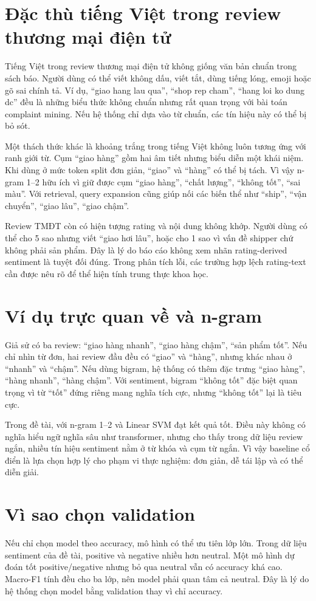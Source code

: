 \section{Đặc thù tiếng Việt trong review thương mại điện tử}
Tiếng Việt trong review thương mại điện tử không giống văn bản chuẩn trong sách báo. Người dùng có thể viết không dấu, viết tắt, dùng tiếng lóng, emoji hoặc gõ sai chính tả. Ví dụ, “giao hang lau qua”, “shop rep cham”, “hang loi ko dung dc” đều là những biểu thức không chuẩn nhưng rất quan trọng với bài toán complaint mining. Nếu hệ thống chỉ dựa vào từ chuẩn, các tín hiệu này có thể bị bỏ sót.

Một thách thức khác là khoảng trắng trong tiếng Việt không luôn tương ứng với ranh giới từ. Cụm “giao hàng” gồm hai âm tiết nhưng biểu diễn một khái niệm. Khi dùng \TFIDF{} ở mức token split đơn giản, “giao” và “hàng” có thể bị tách. Vì vậy n-gram 1--2 hữu ích vì giữ được cụm “giao hàng”, “chất lượng”, “không tốt”, “sai màu”. Với retrieval, query expansion cũng giúp nối các biến thể như “ship”, “vận chuyển”, “giao lâu”, “giao chậm”.

Review TMĐT còn có hiện tượng rating và nội dung không khớp. Người dùng có thể cho 5 sao nhưng viết “giao hơi lâu”, hoặc cho 1 sao vì vấn đề shipper chứ không phải sản phẩm. Đây là lý do báo cáo không xem nhãn rating-derived sentiment là tuyệt đối đúng. Trong phân tích lỗi, các trường hợp lệch rating-text cần được nêu rõ để thể hiện tính trung thực khoa học.

\section{Ví dụ trực quan về \TFIDF{} và n-gram}
Giả sử có ba review: “giao hàng nhanh”, “giao hàng chậm”, “sản phẩm tốt”. Nếu chỉ nhìn từ đơn, hai review đầu đều có “giao” và “hàng”, nhưng khác nhau ở “nhanh” và “chậm”. Nếu dùng bigram, hệ thống có thêm đặc trưng “giao hàng”, “hàng nhanh”, “hàng chậm”. Với sentiment, bigram “không tốt” đặc biệt quan trọng vì từ “tốt” đứng riêng mang nghĩa tích cực, nhưng “không tốt” lại là tiêu cực.

Trong đề tài, \TFIDF{} với n-gram 1--2 và Linear SVM đạt kết quả tốt. Điều này không có nghĩa \TFIDF{} hiểu ngữ nghĩa sâu như transformer, nhưng cho thấy trong dữ liệu review ngắn, nhiều tín hiệu sentiment nằm ở từ khóa và cụm từ ngắn. Vì vậy baseline cổ điển là lựa chọn hợp lý cho phạm vi thực nghiệm: đơn giản, dễ tái lập và có thể diễn giải.

\section{Vì sao chọn validation \MacroFOne{}}
Nếu chỉ chọn model theo accuracy, mô hình có thể ưu tiên lớp lớn. Trong dữ liệu sentiment của đề tài, positive và negative nhiều hơn neutral. Một mô hình dự đoán tốt positive/negative nhưng bỏ qua neutral vẫn có accuracy khá cao. Macro-F1 tính đều cho ba lớp, nên model phải quan tâm cả neutral. Đây là lý do hệ thống chọn model bằng validation \MacroFOne{} thay vì chỉ accuracy.

